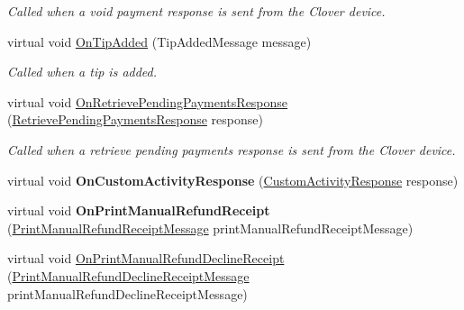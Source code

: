 \begin{DoxyCompactItemize}
\begin{DoxyCompactList}\small\item\em Called when a void payment response is sent from the Clover device. \end{DoxyCompactList}\item 
virtual void \hyperlink{classcom_1_1clover_1_1remotepay_1_1sdk_1_1_default_clover_connector_listener_a8d3f850e69a03e0ef259f992a4865b52}{On\+Tip\+Added} (Tip\+Added\+Message message)
\begin{DoxyCompactList}\small\item\em Called when a tip is added. \end{DoxyCompactList}\item 
virtual void \hyperlink{classcom_1_1clover_1_1remotepay_1_1sdk_1_1_default_clover_connector_listener_afb505c42e77209a31ce61911641f40cf}{On\+Retrieve\+Pending\+Payments\+Response} (\hyperlink{classcom_1_1clover_1_1remotepay_1_1sdk_1_1_retrieve_pending_payments_response}{Retrieve\+Pending\+Payments\+Response} response)
\begin{DoxyCompactList}\small\item\em Called when a retrieve pending payments response is sent from the Clover device. \end{DoxyCompactList}\item 
\mbox{\label{classcom_1_1clover_1_1remotepay_1_1sdk_1_1_default_clover_connector_listener_a874fb9be8608ea95da432b9c7230d8ea}} 
virtual void {\bfseries On\+Custom\+Activity\+Response} (\hyperlink{classcom_1_1clover_1_1remotepay_1_1sdk_1_1_custom_activity_response}{Custom\+Activity\+Response} response)
\item 
\mbox{\label{classcom_1_1clover_1_1remotepay_1_1sdk_1_1_default_clover_connector_listener_aed1c6c0e8dec09e3e724d752747d1b05}} 
virtual void {\bfseries On\+Print\+Manual\+Refund\+Receipt} (\hyperlink{classcom_1_1clover_1_1remotepay_1_1sdk_1_1_print_manual_refund_receipt_message}{Print\+Manual\+Refund\+Receipt\+Message} print\+Manual\+Refund\+Receipt\+Message)
\item 
virtual void \hyperlink{classcom_1_1clover_1_1remotepay_1_1sdk_1_1_default_clover_connector_listener_ad1ee83616c84ca13a0e02a3203d20f69}{On\+Print\+Manual\+Refund\+Decline\+Receipt} (\hyperlink{classcom_1_1clover_1_1remotepay_1_1sdk_1_1_print_manual_refund_decline_receipt_message}{Print\+Manual\+Refund\+Decline\+Receipt\+Message} print\+Manual\+Refund\+Decline\+Receipt\+Message)

\end{DoxyCompactItemize}
